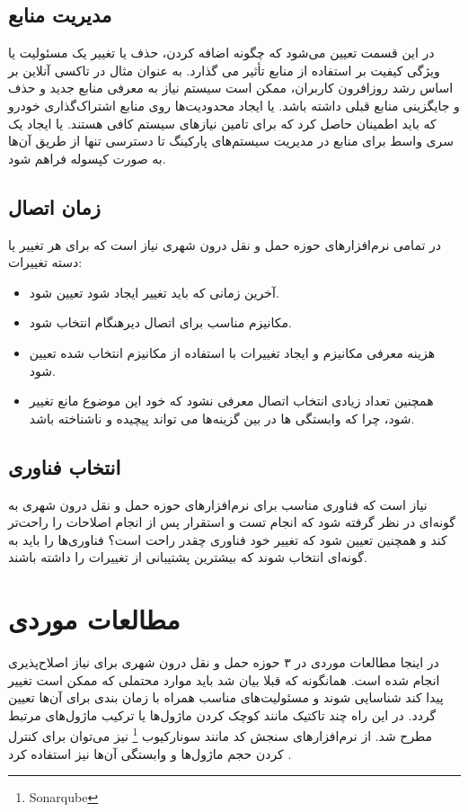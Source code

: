 \subsection{مدیریت منابع}
در این قسمت تعیین می‌شود که چگونه اضافه کردن، حذف یا تغییر یک مسئولیت یا ویژگی کیفیت بر استفاده از منابع تأثیر می گذارد. به عنوان مثال در تاکسی آنلاین بر اساس رشد روزافرون کاربران، ممکن است سیستم نیاز به معرفی منابع جدید و حذف و جایگزینی منابع قبلی داشته باشد. یا ایجاد محدودیت‌ها روی منابع اشتراک‌گذاری خودرو که باید اطمینان حاصل کرد که برای تامین نیازهای سیستم کافی هستند. یا ایجاد یک سری واسط برای منابع در مدیریت سیستم‌های پارکینگ تا دسترسی تنها از طریق آن‌ها به صورت کپسوله فراهم شود.
\subsection{زمان اتصال}
در تمامی نرم‌افزارهای حوزه حمل و نقل درون شهری نیاز است که برای هر تغییر یا دسته تغییرات:
\begin{itemize}
\item
آخرین زمانی که باید تغییر ایجاد شود تعیین شود.
\item
مکانیزم مناسب برای اتصال دیرهنگام انتخاب شود.
\item
هزینه معرفی مکانیزم و ایجاد تغییرات با استفاده از مکانیزم انتخاب شده تعیین شود.
\item
همچنین تعداد زیادی انتخاب اتصال معرفی نشود که خود این موضوع مانع تغییر شود، چرا که وابستگی ها در بین گزینه‌ها می تواند پیچیده و ناشناخته باشد.
\end{itemize}
\subsection{انتخاب فناوری}
نیاز است که فناوری مناسب برای نرم‌افزارهای حوزه حمل و نقل درون شهری به گونه‌ای در نظر گرفته شود که انجام تست و استقرار پس از انجام اصلاحات را راحت‌تر کند و همچنین تعیین شود که تغییر خود فناوری چقدر راحت است؟ فناوری‌ها را باید به گونه‌ای انتخاب شوند که بیشترین پشتیبانی از تغییرات را داشته باشند.

\section{مطالعات موردی}

در اینجا مطالعات موردی در ۳ حوزه حمل و نقل درون شهری برای نیاز اصلاح‌‌پذیری انجام شده است.
همانگونه که قبلا بیان شد باید موارد محتملی که ممکن است تغییر پیدا کند شناسایی شوند و مسئولیت‌های مناسب همراه با زمان بندی برای آن‌ها تعیین گردد. در این راه چند تاکتیک مانند کوچک کردن ماژول‌ها یا ترکیب ماژول‌های مرتبط مطرح شد.
از نرم‌افزارهای سنجش کد مانند سونارکیوب
\footnote{Sonarqube}
نیز می‌توان برای کنترل کردن حجم ماژول‌ها و وابستگی آن‌ها نیز استفاده کرد .\cite{sonarqube_cite}

